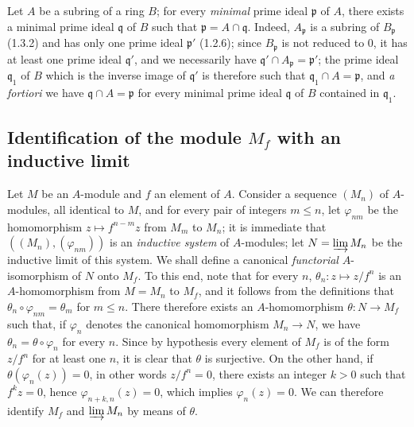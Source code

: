 \begin{env}[1.5.8]
\label{0.1.5.8}
Let $A$ be a subring of a ring $B$; for every \emph{minimal} prime
ideal $\mathfrak p$ of $A$, there exists a minimal prime ideal
$\mathfrak q$ of $B$ such that $\mathfrak p=A\cap\mathfrak q$. Indeed,
$A_{\mathfrak p}$ is a subring of $B_{\mathfrak p}$ (1.3.2) and has
only one prime ideal $\mathfrak p'$ (1.2.6); since $B_{\mathfrak p}$ is not
reduced to $0$, it has at least one prime ideal $\mathfrak q'$, and we
necessarily have $\mathfrak q'\cap A_{\mathfrak p}=\mathfrak p'$; the prime ideal
$\mathfrak q_1$ of $B$ which is the inverse image of $\mathfrak q'$ is therefore such that
$\mathfrak q_1\cap A=\mathfrak p$, and \emph{a fortiori} we have
$\mathfrak q\cap A=\mathfrak p$ for every minimal prime ideal $\mathfrak q$
of $B$ contained in $\mathfrak q_1$.
\end{env}

\subsection{Identification of the module $M_f$ with an inductive limit}
\label{subsection:0.1.6}

\begin{env}[1.6.1]
\label{0.1.6.1}
Let $M$ be an $A$-module and $f$ an element of $A$. Consider a sequence
$(M_n)$ of $A$-modules, all identical to $M$, and for every pair of integers
$m\leq n$, let $\varphi_{nm}$ be the homomorphism $z\mapsto f^{n-m}z$ from $M_m$
to $M_n$; it is immediate that $((M_n),(\varphi_{nm}))$ is an \emph{inductive
system} of $A$-modules; let $N=\varinjlim M_n$ be the inductive limit of this
system. We shall define a canonical \emph{functorial} $A$-isomorphism of
$N$ onto $M_f$. To this end, note that for every $n$,
$\theta_n:z\mapsto z/f^n$ is an $A$-homomorphism from $M=M_n$ to $M_f$, and
it follows from the definitions that $\theta_n\circ\varphi_{nm}=\theta_m$ for
$m\leq n$. There therefore exists an $A$-homomorphism $\theta:N\to M_f$ such that, if
$\varphi_n$ denotes the canonical homomorphism $M_n\to N$, we have
$\theta_n=\theta\circ\varphi_n$ for every $n$. Since by hypothesis every element
of $M_f$ is of the form $z/f^n$ for at least one $n$, it is clear that
$\theta$ is surjective. On the other hand, if $\theta(\varphi_n(z))=0$, in other words
$z/f^n=0$, there exists an integer $k>0$ such that $f^kz=0$, hence
$\varphi_{n+k,n}(z)=0$, which implies $\varphi_n(z)=0$. We can therefore
identify $M_f$ and $\varinjlim M_n$ by means of $\theta$.
\end{env}

